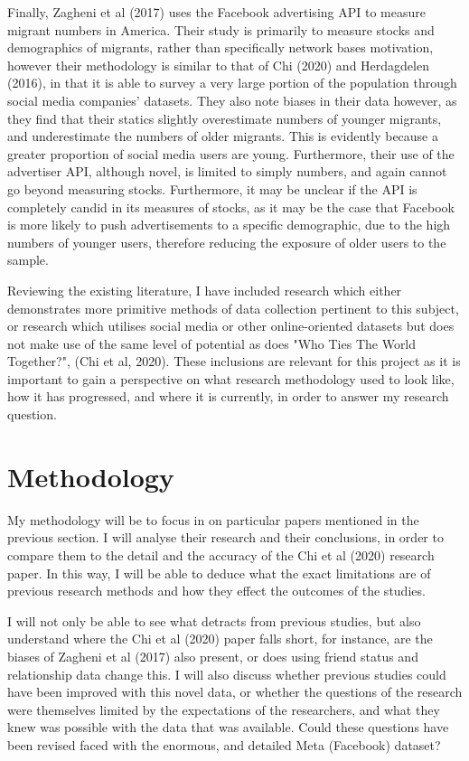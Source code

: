 \documentclass[12pt]{article}
\begin{document}
Finally, Zagheni et al (2017) uses the Facebook advertising API to measure migrant numbers 
in America. Their study is primarily to measure stocks and demographics of migrants, 
rather than specifically network bases motivation, however their methodology is similar to 
that of Chi (2020) and Herdagdelen (2016), in that it is able to survey a very large portion of 
the population through social media companies' datasets. They also note biases in their data 
however, as they find that their statics slightly overestimate numbers of younger 
migrants, and underestimate the numbers of older migrants. This is evidently because a 
greater proportion of social media users are young. Furthermore, their use of the advertiser 
API, although novel, is limited to simply numbers, and again cannot go beyond measuring stocks. 
Furthermore, it may be unclear if the API is completely candid in its measures of stocks, 
as it may be the case that Facebook is more likely to push advertisements to a 
specific demographic, due to the high numbers of younger users, therefore reducing the 
exposure of older users to the sample.

Reviewing the existing literature, I have included research which either demonstrates more 
primitive methods of data collection pertinent to this subject, or research which 
utilises social media or other online-oriented datasets but does not make use of the 
same level of potential as does "Who Ties The World Together?", (Chi et al, 2020). These 
inclusions are relevant for this project as it is important to gain a perspective on 
what research methodology used to look like, how it has progressed, and where it is currently,
in order to answer my research question.

\section{Methodology}

My methodology will be to focus in on particular papers mentioned in the previous section. 
I will analyse their research and their conclusions, in order to compare them to the 
detail and the accuracy of the Chi et al (2020) research paper. In this way, I will be 
able to deduce what the exact limitations are of previous research methods and how they 
effect the outcomes of the studies. 

I will not only be able to see what detracts from previous studies, but also understand 
where the Chi et al (2020) paper falls short, for instance, are the biases of Zagheni 
et al (2017) also present, or does using friend status and relationship data change this.
I will also discuss whether previous studies could have been improved with this novel 
data, or whether the questions of the research were themselves limited by the expectations
of the researchers, and what they knew was possible with the data that was available. Could 
these questions have been revised faced with the enormous, and detailed Meta (Facebook) dataset?
\end{document}
